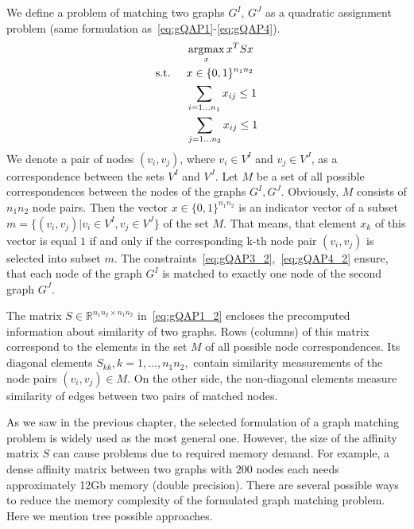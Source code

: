 We define a problem of matching two graphs $G^I$, $G^J$ as a quadratic assignment problem (same formulation as~\eqref{eq:gQAP1}-\eqref{eq:gQAP4}). 
\begin{alignat}{2}
    &     && \mathop{\rm argmax}_x{x^TSx}                           \label{eq:gQAP1_2}\\
    & \text{s.t. } &&  x\in \{0,1\}^{n_1n_2}            \label{eq:gQAP2_2}\\
    &             &&  \sum_{i=1\dots n_1} x_{ij}\le 1   \label{eq:gQAP3_2}\\
    &             &&  \sum_{j=1\dots n_2} x_{ij}\le 1   \label{eq:gQAP4_2}
\end{alignat}
We denote a pair of nodes $(v_i,v_j)$, where $v_i\in V^I$ and $v_j\in V^J$, as a correspondence between the sets $V^I$ and $V^J$. Let $M$ be a set of all possible correspondences between the nodes of the graphs $G^I,G^J$. Obviously, $M$ consists of $n_1n_2$ node pairs.  Then the vector $x\in \{0,1\}^{n_1n_2}$ is an indicator vector of a subset $m=\{(v_i,v_j)|v_i\in V^I,v_j\in V^J\}$ of the set $M$. That means, that element $x_k$ of this vector is equal $1$ if and only if the corresponding k-th node pair $(v_i,v_j)$ is selected into subset $m$. The constraints~\eqref{eq:gQAP3_2},~\eqref{eq:gQAP4_2} ensure, that each node of the graph $G^I$ is matched to exactly one node of the second graph $G^J$.

The matrix $S\in\mathbb{R}^{n_1n_2\times n_1n_2}$ in~\eqref{eq:gQAP1_2} encloses the precomputed information about similarity of two graphs. Rows (columns) of this matrix correspond to the elements in the set $M$ of all possible node correspondences. Its diagonal elements $S_{kk},k=1,\dots,n_1n_2,$ contain similarity measurements of the node pairs $(v_i,v_j)\in M$. On the other side, the non-diagonal elements measure similarity of edges between two pairs of matched nodes. 

As we saw in the previous chapter, the selected formulation of a graph matching problem is widely used as the most general one. However, the size of the affinity matrix $S$ can cause problems due to required memory demand. For example, a dense affinity matrix between two graphs with $200$ nodes each needs approximately 12Gb memory (double precision). There are several possible ways to reduce the memory complexity of the formulated graph matching problem. Here we mention tree possible approaches.

